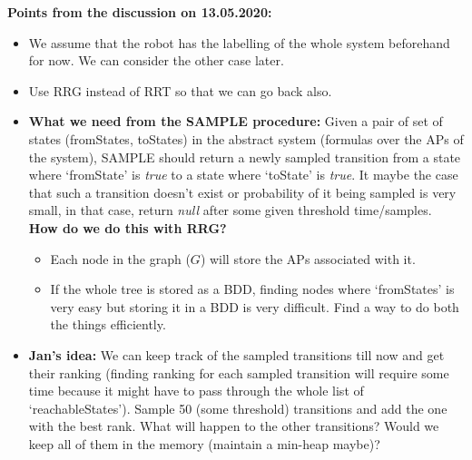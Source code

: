 \documentclass{article}
\newcommand{\kush}[1]{{\color{blue} #1}}
\begin{document}
\vspace{20pt}
\textbf{Points from the discussion on 13.05.2020:}
	\begin{itemize}
		\item We assume that the robot has the labelling of the whole system beforehand for now. We can consider the other case later.
		
		\item Use RRG instead of RRT so that we can go back also.
		
		\item \textbf{What we need from the SAMPLE procedure:} Given a pair of set of states (fromStates, toStates) in the abstract system (formulas over the APs of the system), SAMPLE should return a newly sampled transition from a state where `fromState' is \textit{true} to a state where `toState' is \textit{true}. It maybe the case that such a transition doesn't exist or probability of it being sampled is very small, in that case, return \emph{null} after some given threshold time/samples.\newline
		\textbf{How do we do this with RRG?}
		\begin{itemize}
			\item Each node in the graph ($G$) will store the APs associated with it. 
			\item If the whole tree is stored as a BDD, finding nodes where `fromStates' is very easy but storing it in a BDD is very difficult. \kush{Find a way to do both the things efficiently.}
		\end{itemize}
		
		\item \textbf{Jan's idea:} We can keep track of the sampled transitions till now and get their ranking (finding ranking for each sampled transition will require some time because it might have to pass through the whole list of `reachableStates'). Sample 50 (some threshold) transitions and add the one with the best rank. \kush{What will happen to the other transitions? Would we keep all of them in the memory (maintain a min-heap maybe)?}
	\end{itemize}
\end{document}
